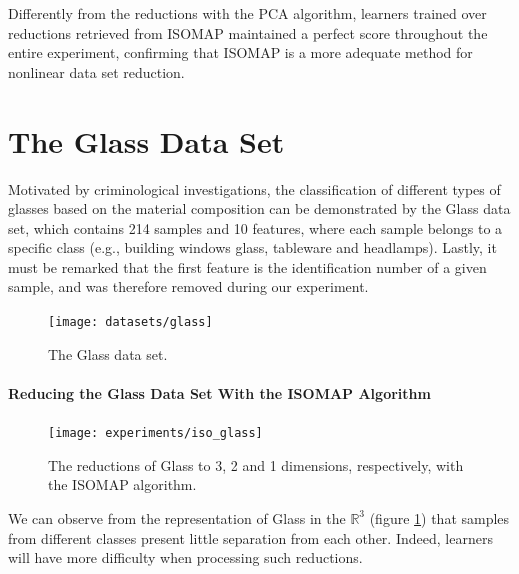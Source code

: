 Differently from the reductions with the PCA algorithm, learners trained over reductions retrieved from ISOMAP maintained a perfect score throughout the entire experiment, confirming that ISOMAP is a more adequate method for nonlinear data set reduction.

\clearpage
\section{The Glass Data Set}

Motivated by criminological investigations, the classification of different types of glasses based on the material composition can be demonstrated by the Glass data set, which contains 214 samples and 10 features, where each sample belongs to a specific class (e.g., building windows glass, tableware and headlamps). Lastly, it must be remarked that the first feature is the identification number of a given sample, and was therefore removed during our experiment.
\newline\newline

\begin{figure}[H]
	\centering
	\texttt{[image: datasets/glass]}
	\captionsetup{justification=centering}
	\caption{The Glass data set.}
\end{figure}

\newpage
\paragraph{Reducing the Glass Data Set With the ISOMAP Algorithm}

\begin{figure}[H]
	\centering
	\captionsetup{justification=centering}
	\texttt{[image: experiments/iso\_glass]}
	\caption{The reductions of Glass to 3, 2 and 1 dimensions, respectively, with the ISOMAP algorithm.}
	\label{fig:dsglassiso}
\end{figure}

We can observe from the representation of Glass in the $\mathbb{R}^3$ (figure \ref{fig:dsglassiso}) that samples from different classes present little separation from each other. Indeed, learners will have more difficulty when processing such reductions.

